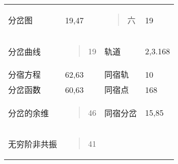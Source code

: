 \begin{longtable}[]{@{}llll@{}}
\begin{minipage}[t]{0.22\columnwidth}
分岔图\strut
\end{minipage} & \begin{minipage}[t]{0.22\columnwidth}\raggedright
19,47\strut
\end{minipage} & \begin{minipage}[t]{0.22\columnwidth}\raggedright
\begin{quote}
六
\end{quote}\strut
\end{minipage} & \begin{minipage}[t]{0.22\columnwidth}\raggedright
19\strut
\end{minipage}\tabularnewline
\begin{minipage}[t]{0.22\columnwidth}\raggedright
分岔曲线\strut
\end{minipage} & \begin{minipage}[t]{0.22\columnwidth}\raggedright
\begin{quote}
19
\end{quote}\strut
\end{minipage} & \begin{minipage}[t]{0.22\columnwidth}\raggedright
轨道\strut
\end{minipage} & \begin{minipage}[t]{0.22\columnwidth}\raggedright
2,3.168\strut
\end{minipage}\tabularnewline
分宿方程 & 62,63 & 同宿轨 & 10\tabularnewline
分岔函数 & 60,63 & 同宿点 & 168\tabularnewline
\begin{minipage}[t]{0.22\columnwidth}\raggedright
分岔的余维\strut
\end{minipage} & \begin{minipage}[t]{0.22\columnwidth}\raggedright
\begin{quote}
46
\end{quote}\strut
\end{minipage} & \begin{minipage}[t]{0.22\columnwidth}\raggedright
同宿分岔\strut
\end{minipage} & \begin{minipage}[t]{0.22\columnwidth}\raggedright
15,85\strut
\end{minipage}\tabularnewline
\begin{minipage}[t]{0.22\columnwidth}\raggedright
无穷阶非共振\strut
\end{minipage} & \begin{minipage}[t]{0.22\columnwidth}\raggedright
\begin{quote}
41
\end{quote}\strut

\end{minipage}
\end{longtable}
